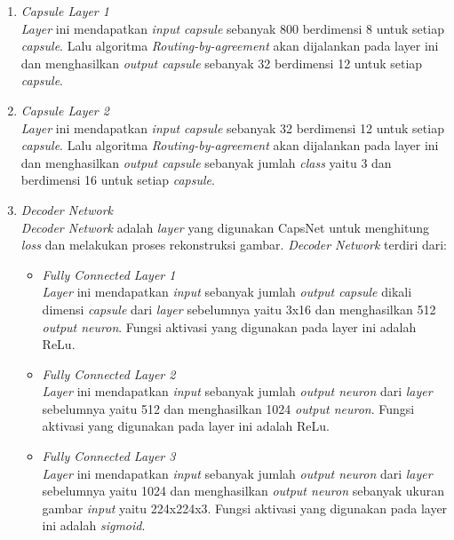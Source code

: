 \documentclass{article}
\begin{document}
\begin{enumerate}
			\item \textit{Capsule Layer 1}\\
			\textit{Layer} ini mendapatkan \textit{input capsule} sebanyak 800 berdimensi 8 untuk setiap \textit{capsule}. Lalu algoritma \textit{Routing-by-agreement} akan dijalankan pada layer ini dan menghasilkan \textit{output capsule} sebanyak 32 berdimensi 12 untuk setiap \textit{capsule}.
			
			\item \textit{Capsule Layer 2}\\
			\textit{Layer} ini mendapatkan \textit{input capsule} sebanyak 32 berdimensi 12 untuk setiap \textit{capsule}. Lalu algoritma \textit{Routing-by-agreement} akan dijalankan pada layer ini dan menghasilkan \textit{output capsule} sebanyak jumlah \textit{class} yaitu 3 dan berdimensi 16 untuk setiap \textit{capsule}.
			
			\item \textit{Decoder Network}\\
			\textit{Decoder Network} adalah \textit{layer} yang digunakan CapsNet untuk menghitung \textit{loss} dan melakukan proses rekonstruksi gambar. \textit{Decoder Network} terdiri dari:
			\begin{itemize}
				\item \textit{Fully Connected Layer 1}\\
				\textit{Layer} ini mendapatkan \textit{input} sebanyak jumlah \textit{output capsule} dikali dimensi \textit{capsule} dari \textit{layer} sebelumnya yaitu 3x16 dan menghasilkan 512 \textit{output neuron}. Fungsi aktivasi yang digunakan pada layer ini adalah ReLu.
				
				\item \textit{Fully Connected Layer 2}\\
				\textit{Layer} ini mendapatkan \textit{input} sebanyak jumlah \textit{output neuron} dari \textit{layer} sebelumnya yaitu 512 dan menghasilkan 1024 \textit{output neuron}. Fungsi aktivasi yang digunakan pada layer ini adalah ReLu.
				
				\item \textit{Fully Connected Layer 3}\\
				\textit{Layer} ini mendapatkan \textit{input} sebanyak jumlah \textit{output neuron} dari \textit{layer} sebelumnya yaitu 1024 dan menghasilkan \textit{output neuron} sebanyak ukuran gambar \textit{input} yaitu 224x224x3. Fungsi aktivasi yang digunakan pada layer ini adalah \textit{sigmoid}.
			\end{itemize}
			
		\end{enumerate}
\end{document}
